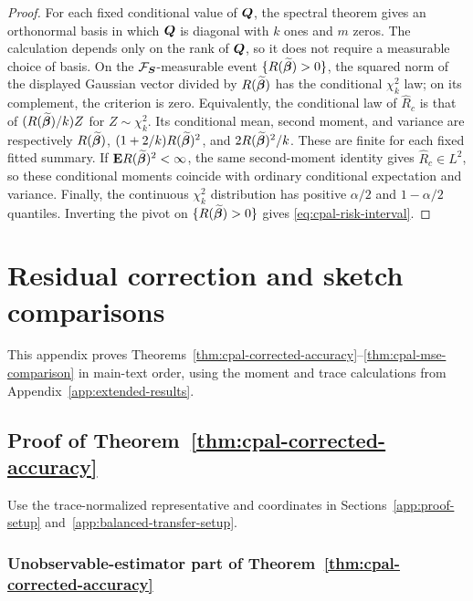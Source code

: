 \documentclass{article}
\theoremstyle{plain} %
\theoremstyle{definition} %
\theoremstyle{definition} %
\begin{document}
\begin{proof}
For each fixed conditional value of $\boldsymbol{Q}$, the spectral theorem gives an
orthonormal basis in which $\boldsymbol{Q}$ is diagonal with $k$ ones and $m$ zeros.
The calculation depends only on the rank of $\boldsymbol{Q}$, so it does not require
a measurable choice of basis. On the ${\mathcal F}_{\boldsymbol{S}}$-measurable event
$\{R(\widetilde{\boldsymbol{\beta}})>0\}$, the squared norm of the displayed
Gaussian vector divided by $R(\widetilde{\boldsymbol{\beta}})$ has the conditional
$\chi^2_k$ law; on its complement, the criterion is zero. Equivalently,
the conditional law of $\widehat R_c$ is that of
$(R(\widetilde{\boldsymbol{\beta}})/k)Z$ for $Z\sim\chi^2_k$. Its conditional mean,
second moment, and variance are respectively
$R(\widetilde{\boldsymbol{\beta}})$,
$(1+2/k)R(\widetilde{\boldsymbol{\beta}})^2$, and
$2R(\widetilde{\boldsymbol{\beta}})^2/k$. These are finite for each fixed fitted
summary. If ${\mathbf{E}} R(\widetilde{\boldsymbol{\beta}})^2<\infty$, the same second-moment
identity gives $\widehat R_c\in L^2$, so these conditional
moments coincide with ordinary conditional expectation and variance.
Finally, the continuous $\chi^2_k$ distribution has positive
$\alpha/2$ and $1-\alpha/2$ quantiles. Inverting the pivot on
$\{R(\widetilde{\boldsymbol{\beta}})>0\}$ gives
\eqref{eq:cpal-risk-interval}.
\end{proof}

\clearpage
\section{Residual correction and sketch comparisons}
\label{app:setup-proofs}
\label{app:underparameterized-proofs}

This appendix proves
Theorems~\ref{thm:cpal-corrected-accuracy}--\ref{thm:cpal-mse-comparison}
in main-text order, using the moment and trace calculations from
Appendix~\ref{app:extended-results}.

\subsection{Proof of Theorem~\ref{thm:cpal-corrected-accuracy}}

Use the trace-normalized representative and coordinates in
Sections~\ref{app:proof-setup} and~\ref{app:balanced-transfer-setup}.

\subsubsection{Unobservable-estimator part of Theorem~\ref{thm:cpal-corrected-accuracy}}
\label{app:proof-R-sens-general}
\end{document}
